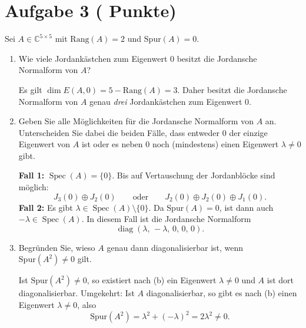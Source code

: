 \documentclass[11pt, a4paper]{article}
\newcommand{\aufgabe}[2]{%
  \section*{\Large\bfseries Aufgabe #1%
  \if\relax\detokenize{#2}\relax\else \hfill\normalfont\normalsize(#2 Punkte)\fi}%
  \vspace{-1.5ex}
}
\begin{document}
\aufgabe{3}{}
Sei $A\in\mathbb{C}^{5\times 5}$ mit $\mathrm{Rang}(A)=2$ und $\mathrm{Spur}(A)=0$.
\begin{enumerate}
  \item Wie viele Jordankästchen zum Eigenwert $0$ besitzt die Jordansche Normalform von $A$?
  \begin{framed}
  Es gilt $\dim E(A,0)=5-\mathrm{Rang}(A)=3$. Daher besitzt die Jordansche
  Normalform von $A$ genau \emph{drei} Jordankästchen zum Eigenwert $0$.
  \end{framed}

  \item Geben Sie alle Möglichkeiten für die Jordansche Normalform von $A$ an. Unterscheiden Sie dabei die beiden Fälle, dass entweder $0$ der einzige Eigenwert von $A$ ist oder es neben $0$ noch (mindestens) einen Eigenwert $\lambda\neq 0$ gibt.
  \begin{framed}
  \textbf{Fall 1:} $\operatorname{Spec}(A)=\{0\}$. Bis auf Vertauschung der
  Jordanblöcke sind möglich:
  \[
    J_3(0)\oplus J_2(0)
    \qquad\text{oder}\qquad
    J_2(0)\oplus J_2(0)\oplus J_1(0).
  \]
  \textbf{Fall 2:} Es gibt $\lambda\in\operatorname{Spec}(A)\setminus\{0\}$.
  Da $\mathrm{Spur}(A)=0$, ist dann auch $-\lambda\in\operatorname{Spec}(A)$.
  In diesem Fall ist die Jordansche Normalform
  \[
    \operatorname{diag}(\lambda,\,-\lambda,\,0,\,0,\,0).
  \]
  \end{framed}

  \item Begründen Sie, wieso $A$ genau dann diagonalisierbar ist, wenn $\mathrm{Spur}(A^2)\neq 0$ gilt.
  \begin{framed}
  Ist $\mathrm{Spur}(A^2)\neq 0$, so existiert nach (b) ein Eigenwert
  $\lambda\neq 0$ und $A$ ist dort diagonalisierbar. Umgekehrt:
  Ist $A$ diagonalisierbar, so gibt es nach (b) einen Eigenwert $\lambda\neq 0$,
  also
  \[
    \mathrm{Spur}(A^2)=\lambda^2+(-\lambda)^2=2\lambda^2\neq 0.
  \]
  \end{framed}
\end{enumerate}
\end{document}
